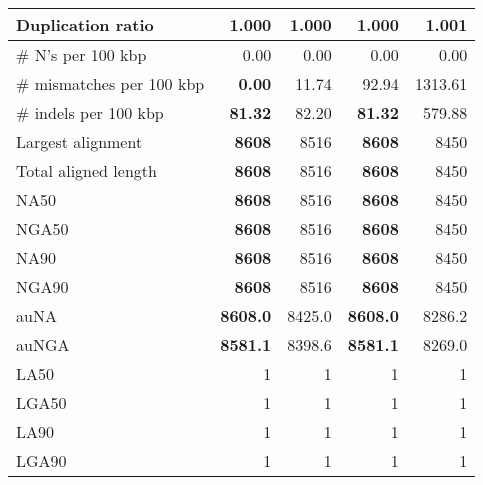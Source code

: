 \documentclass[12pt,a4paper]{article}
\begin{document}
\begin{table}[ht]
\begin{center}
\begin{tabular}{|l*{4}{|r}|}
Duplication ratio & {\bf 1.000} & {\bf 1.000} & {\bf 1.000} & 1.001 \\ \hline
\# N's per 100 kbp & 0.00 & 0.00 & 0.00 & 0.00 \\ \hline
\# mismatches per 100 kbp & {\bf 0.00} & 11.74 & 92.94 & 1313.61 \\ \hline
\# indels per 100 kbp & {\bf 81.32} & 82.20 & {\bf 81.32} & 579.88 \\ \hline
Largest alignment & {\bf 8608} & 8516 & {\bf 8608} & 8450 \\ \hline
Total aligned length & {\bf 8608} & 8516 & {\bf 8608} & 8450 \\ \hline
NA50 & {\bf 8608} & 8516 & {\bf 8608} & 8450 \\ \hline
NGA50 & {\bf 8608} & 8516 & {\bf 8608} & 8450 \\ \hline
NA90 & {\bf 8608} & 8516 & {\bf 8608} & 8450 \\ \hline
NGA90 & {\bf 8608} & 8516 & {\bf 8608} & 8450 \\ \hline
auNA & {\bf 8608.0} & 8425.0 & {\bf 8608.0} & 8286.2 \\ \hline
auNGA & {\bf 8581.1} & 8398.6 & {\bf 8581.1} & 8269.0 \\ \hline
LA50 & 1 & 1 & 1 & 1 \\ \hline
LGA50 & 1 & 1 & 1 & 1 \\ \hline
LA90 & 1 & 1 & 1 & 1 \\ \hline
LGA90 & 1 & 1 & 1 & 1 \\ \hline
\end{tabular}
\end{center}
\end{table}
\end{document}
